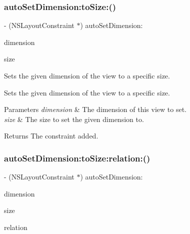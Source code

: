 \subsubsection{\texorpdfstring{auto\+Set\+Dimension\+:to\+Size\+:()}{autoSetDimension:toSize:()}}
{\footnotesize\ttfamily -\/ (N\+S\+Layout\+Constraint $\ast$) auto\+Set\+Dimension\+: \begin{DoxyParamCaption}\item[{(A\+L\+Dimension)}]{dimension }\item[{toSize:(C\+G\+Float)}]{size }\end{DoxyParamCaption}}

Sets the given dimension of the view to a specific size.

Sets the given dimension of the view to a specific size.


\begin{DoxyParams}{Parameters}
{\em dimension} & The dimension of this view to set. \\
\hline
{\em size} & The size to set the given dimension to. \\
\hline
\end{DoxyParams}
\begin{DoxyReturn}{Returns}
The constraint added. 
\end{DoxyReturn}
\mbox{\label{category_u_i_view_07_auto_layout_08_a2c6564d02b76d4aa21ed349dbc912b7c}} 
\subsubsection{\texorpdfstring{auto\+Set\+Dimension\+:to\+Size\+:relation\+:()}{autoSetDimension:toSize:relation:()}}
{\footnotesize\ttfamily -\/ (N\+S\+Layout\+Constraint $\ast$) auto\+Set\+Dimension\+: \begin{DoxyParamCaption}\item[{(A\+L\+Dimension)}]{dimension }\item[{toSize:(C\+G\+Float)}]{size }\item[{relation:(N\+S\+Layout\+Relation)}]{relation }\end{DoxyParamCaption}}

